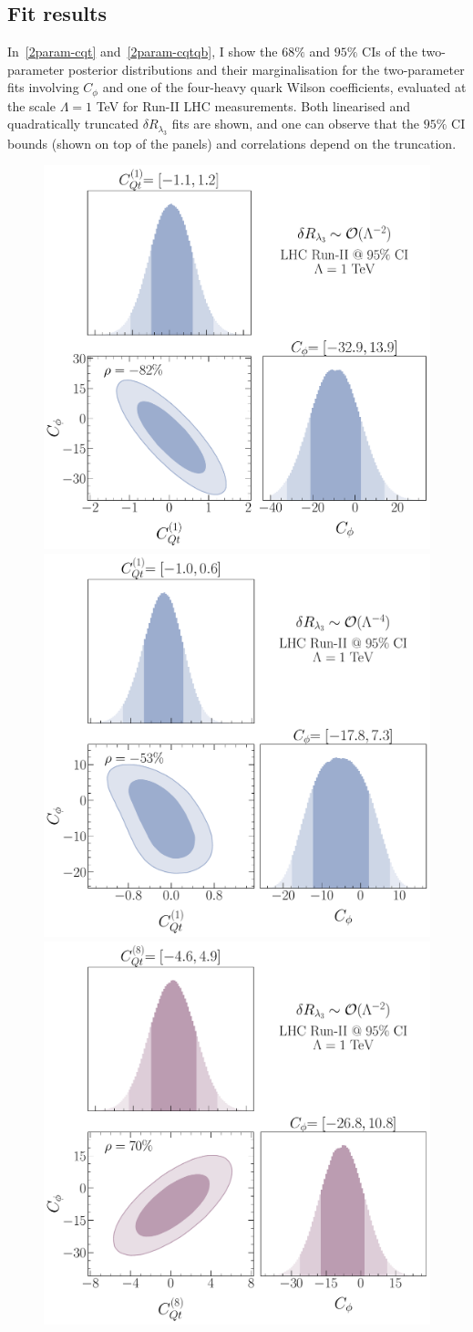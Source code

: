 	\subsection{Fit results}
	\par 
	In~\autoref{2param-cqt} and~\autoref{2param-cqtqb}, I show the $68\%$ and $ 95\%$  CIs of the two-parameter posterior distributions and their marginalisation for the two-parameter fits involving $C_\phi$ and one of the four-heavy quark Wilson coefficients, evaluated at the scale $\Lambda=1$ TeV for Run-II LHC measurements.  
	Both linearised and quadratically truncated $\delta R_{\lambda_3}$ fits are shown, and one can observe that the $95\%$ CI bounds (shown on top of the panels) and correlations depend on the truncation.
	\begin{figure}[h!]
		\begin{center}
			\includegraphics[width=0.45\linewidth]{fig/Cqt1_LHC_RunII_linearl3_rge}
			\includegraphics[width=0.45\linewidth]{fig/Cqt1_LHC_RunII_quadl3_rge} \\ 
			\includegraphics[width=0.45\linewidth]{fig/Cqt8_LHC_RunII_linearl3_rge}

\end{center}
\end{figure}
